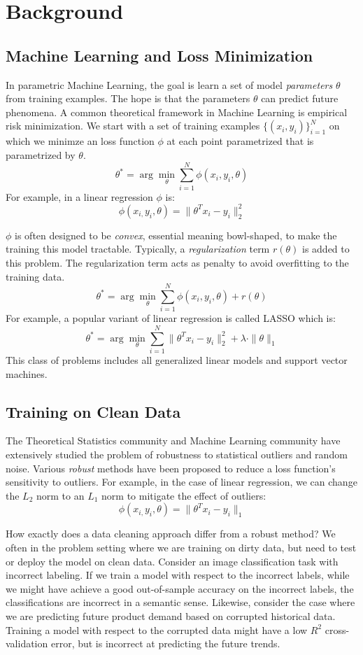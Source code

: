 \section{Background}
\subsection{Machine Learning and Loss Minimization}
In parametric Machine Learning, the goal is learn a set of model \emph{parameters} $\theta$ from training examples.
The hope is that the parameters $\theta$ can predict future phenomena. 
A common theoretical framework in Machine Learning is empirical risk minimization.
We start with a set of training examples $\{(x_{i},y_{i})\}_{i=1}^{N}$
on which we minimze an loss function $\phi$ at each point parametrized that is parametrized by $\theta$.
\[
 \theta^{*}=\arg\min_{\theta}\sum_{i=1}^{N}\phi(x_{i},y_{i},\theta)
\]
For example, in a linear regression $\phi$ is:
\[
\phi(x_{i,}y_{i},\theta) = \|\theta^Tx_{i} - y_i \|_2^2
\]

$\phi$ is often designed to be \emph{convex}, essential meaning bowl-shaped, to make the training this model 
tractable.
Typically, a \emph{regularization} term $r(\theta)$ is added to this problem.
The regularization term acts as penalty to avoid overfitting to the training data.
\[
 \theta^{*}=\arg\min_{\theta}\sum_{i=1}^{N}\phi(x_{i},y_{i},\theta) + r(\theta)
\]
For example, a popular variant of linear regression is called LASSO which is:
\[
 \theta^{*}=\arg\min_{\theta}\sum_{i=1}^{N}\|\theta^Tx_{i} - y_i \|_2^2 + \lambda \cdot \|\theta\|_1
\]
This class of problems includes all generalized linear models and support vector machines.

\subsection{Training on Clean Data}
The Theoretical Statistics community and Machine Learning community have extensively studied the problem
of robustness to statistical outliers and random noise.
Various \emph{robust} methods have been proposed to reduce a loss function's sensitivity to outliers.
For example, in the case of linear regression, we can change the $L_2$ norm to an $L_1$ norm to mitigate the effect of outliers:
\[
\phi(x_{i,}y_{i},\theta) = \|\theta^Tx_{i} - y_i \|_1
\]

How exactly does a data cleaning approach differ from a robust method?
We often in the problem setting where we are training on dirty data, but need to test or deploy the model on clean data.
Consider an image classification task with incorrect labeling.
If we train a model with respect to the incorrect labels, while we might have achieve a good out-of-sample accuracy on the incorrect labels, the classifications are incorrect in a semantic sense.
Likewise, consider the case where we are predicting future product demand based on corrupted historical data.
Training a model with respect to the corrupted data might have a low $R^2$ cross-validation error, but is incorrect
at predicting the future trends.

